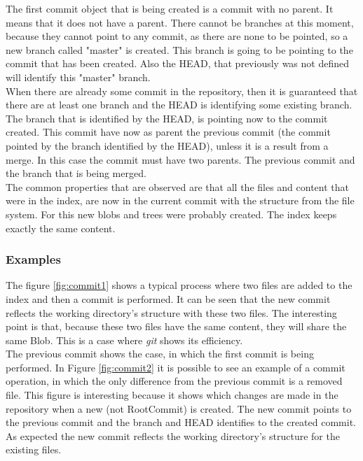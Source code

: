 The first commit object that is being created is a commit with no
parent. It means that it does not have a parent. There cannot be branches
at this moment, because they cannot point to any commit, as there are none to be
pointed, so a new branch called "master" is created. This branch is going to be pointing to 
the commit that has been created. Also the HEAD, that previously was 
not defined will identify this "master" branch.\\

When there are already some commit in the repository, then it is
guaranteed that there are at least one branch and the HEAD is
identifying some existing branch. The branch that is identified by the
HEAD, is pointing now to the commit created. This commit have now as
parent the previous commit (the commit pointed by the branch
identified by the HEAD), unless it is a result from a merge. In this
case the commit must have two parents. The previous commit and the
branch that is being merged.\\

The common properties that are observed are that all the files and
content that were in the index, are now in the current commit with the
structure from the file system. For this new blobs and trees were
probably created. The index keeps exactly the same content.

\subsubsection{Examples}

The figure \ref{fig:commit1} shows a typical process where two files
are added to the index and then a commit is performed. It can be seen
that the new commit reflects the working directory's structure
with these two files. The interesting point is that, because these two files
have the same content, they will share the same
Blob. This is a case where \emph{git} shows its efficiency. \\

The previous commit shows the case, in which the first commit is being
performed. In Figure \ref{fig:commit2} it is possible to see an example 
of a commit operation, in which the only difference from the previous 
commit is a removed file. This figure is 
interesting because it shows which changes are made in the repository when a
new (not RootCommit) is created. The new commit points to the previous commit and
the branch and HEAD identifies to the created commit. As expected the new commit reflects
the working directory's structure for the existing files.\\

